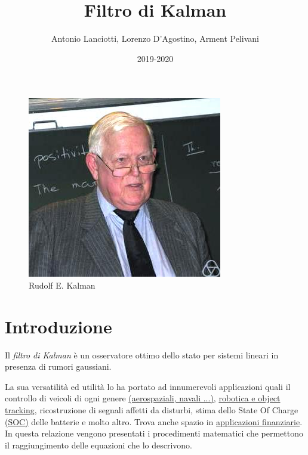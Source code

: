\documentclass{article}
\title{Filtro di Kalman}
\author{Antonio Lanciotti, Lorenzo D'Agostino, Arment Pelivani}
\date{2019-2020}
\numberwithin{equation}{section}
\begin{document}
\maketitle

\begin{figure}[ht]
\centering
\includegraphics[scale=1]{Rudolf_Kalman} 
\caption{Rudolf E. Kalman}
\label{fig:kalman}
\end{figure}

\newpage

\tableofcontents

\newpage



\section{Introduzione}
Il \textit{filtro di Kalman} è un osservatore ottimo dello stato per sistemi lineari in presenza di rumori gaussiani.

La sua versatilità ed utilità lo ha portato ad innumerevoli applicazioni quali il controllo di veicoli di ogni genere  \href{https://www.researchgate.net/publication/224138621_Applications_of_Kalman_Filtering_in_Aerospace_1960_to_the_Present_Historical_Perspectives/link/56aa3b4308ae7f592f0f2af7/download}{(aerospaziali, navali ...)}, \href{https://www.cc.gatech.edu/~afb/classes/CS4495-Fall2014/slides/CS4495-Tracking2.pdf}{robotica e object tracking}, ricostruzione di segnali affetti da disturbi, stima dello State Of Charge \href{https://webcache.googleusercontent.com/search?q=cache:ZiA-RBaxXNcJ:https://www.mdpi.com/1996-1073/8/8/7854/pdf+&cd=1&hl=it&ct=clnk&gl=it&client=firefox-b-d}{(SOC)} delle batterie e molto altro. Trova anche spazio in \href{https://www.researchgate.net/publication/237579118_THE_KALMAN_FILTER_IN_FINANCE_AN_APPLICATION_TO_TERM_STRUCTURE_MODELS_OF_COMMODITY_PRICES_AND_A_COMPARISON_BETWEEN_THE_SIMPLE_AND_THE_EXTENDED_FILTERS}{applicazioni finanziarie}.
In questa relazione vengono presentati i procedimenti matematici che permettono il raggiungimento delle equazioni che lo descrivono.
\end{document}
